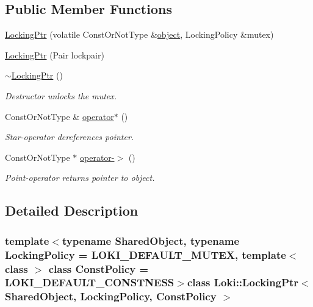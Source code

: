 \subsection*{Public Member Functions}
\begin{DoxyCompactItemize}
\item 
\hyperlink{classLoki_1_1LockingPtr_a9d430a6e7f83dfed1ed5f8111b6826ca}{Locking\+Ptr} (volatile Const\+Or\+Not\+Type \&\hyperlink{structobject}{object}, Locking\+Policy \&mutex)
\item 
\hyperlink{classLoki_1_1LockingPtr_ae4ae5d4ed12dbcac9fffd8241dd1cc2b}{Locking\+Ptr} (Pair lockpair)
\item 
\hypertarget{classLoki_1_1LockingPtr_a72ca595078f8f910966752d573267eed}{}\hyperlink{classLoki_1_1LockingPtr_a72ca595078f8f910966752d573267eed}{$\sim$\+Locking\+Ptr} ()\label{classLoki_1_1LockingPtr_a72ca595078f8f910966752d573267eed}

\begin{DoxyCompactList}\small\item\em Destructor unlocks the mutex. \end{DoxyCompactList}\item 
\hypertarget{classLoki_1_1LockingPtr_a1afb02c9b36189cec222bb0fe5d49471}{}Const\+Or\+Not\+Type \& \hyperlink{classLoki_1_1LockingPtr_a1afb02c9b36189cec222bb0fe5d49471}{operator$\ast$} ()\label{classLoki_1_1LockingPtr_a1afb02c9b36189cec222bb0fe5d49471}

\begin{DoxyCompactList}\small\item\em Star-\/operator dereferences pointer. \end{DoxyCompactList}\item 
\hypertarget{classLoki_1_1LockingPtr_ad717c6fad1cc209cfbd04afb68717824}{}Const\+Or\+Not\+Type $\ast$ \hyperlink{classLoki_1_1LockingPtr_ad717c6fad1cc209cfbd04afb68717824}{operator-\/$>$} ()\label{classLoki_1_1LockingPtr_ad717c6fad1cc209cfbd04afb68717824}

\begin{DoxyCompactList}\small\item\em Point-\/operator returns pointer to object. \end{DoxyCompactList}\end{DoxyCompactItemize}


\subsection{Detailed Description}
\subsubsection*{template$<$typename Shared\+Object, typename Locking\+Policy = L\+O\+K\+I\+\_\+\+D\+E\+F\+A\+U\+L\+T\+\_\+\+M\+U\+T\+E\+X, template$<$ class $>$ class Const\+Policy = L\+O\+K\+I\+\_\+\+D\+E\+F\+A\+U\+L\+T\+\_\+\+C\+O\+N\+S\+T\+N\+E\+S\+S$>$class Loki\+::\+Locking\+Ptr$<$ Shared\+Object, Locking\+Policy, Const\+Policy $>$}

